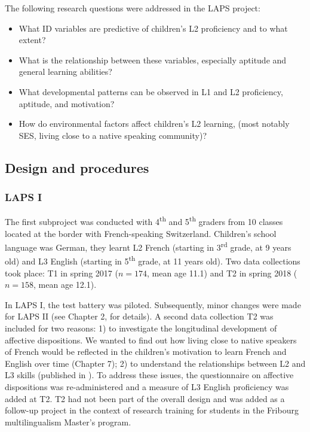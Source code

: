 \documentclass[output=paper]{langsci/langscibook}
\begin{document}
The following research questions were addressed in the LAPS project:

\begin{itemize}
\item What ID variables are predictive of children’s L2 proficiency and to what extent?
\item What is the relationship between these variables, especially aptitude and general learning abilities?
\item What developmental patterns can be observed in L1 and L2 proficiency, aptitude, and motivation?
\item How do environmental factors affect children’s L2 learning, (most notably SES, living close to a native speaking community)?
\end{itemize}


\subsection{Design and procedures}
\subsubsection{LAPS I}\largerpage

The first subproject was conducted with 4\textsuperscript{th} and 5\textsuperscript{th} graders from 10 classes located at the border with French-speaking Switzerland. Children’s school language was German, they learnt L2 French (starting in 3\textsuperscript{rd} grade, at 9 years old) and L3 English (starting in 5\textsuperscript{th} grade, at 11 years old). Two data collections took place: T1 in spring 2017 ($n=174$, mean age 11.1) and T2 in spring 2018 ($n=158$, mean age 12.1).

In LAPS I, the test battery was piloted. Subsequently, minor changes were made for LAPS II (see Chapter 2,  for details). A second data collection T2 was included for two reasons: 1) to investigate the longitudinal development of affective dispositions. We wanted to find out how living close to native speakers of French would be reflected in the children’s motivation to learn French and English over time (Chapter 7); 2) to understand the relationships between L2 and L3 skills (published in \citealt{BertheleUdry2019}). To address these issues, the questionnaire on affective dispositions was re-administered and a measure of L3 English proficiency was added at T2. T2 had not been part of the overall design and was added as a follow-up project in the context of research training for students in the Fribourg multilingualism Master’s program.
\end{document}
